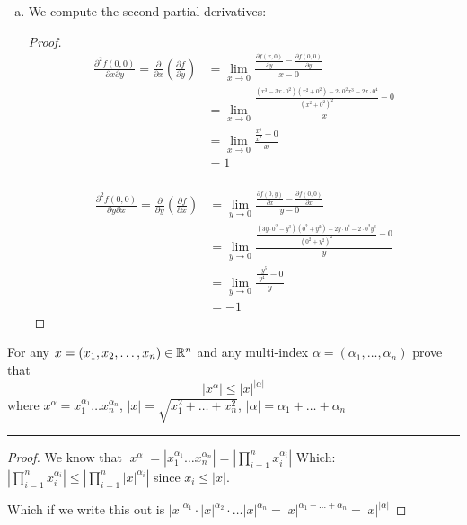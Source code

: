 \documentclass[11pt]{article}
\begin{document}
\begin{enumerate}[(a)]
    \item We compute the second partial derivatives:
    \begin{proof}
        
        \begin{align*}
            \frac{\partial ^2 f(0,0)}{\partial x \partial y} = \frac{\partial}{\partial x} \left( \frac{\partial f}{\partial y} \right) &= 
                \lim_{x \to 0} \frac{\frac{\partial f(x,0)}{\partial y} - \frac{\partial f(0,0)}{\partial y}}{x - 0}\\
            &= \lim_{x \to 0} \frac{\frac{(x^3 - 3x \cdot 0^2)(x^2 + 0^2) - 2 \cdot 0^2x^3-2x \cdot 0^4}{(x^2 + 0^2)^2} - 0}{x} \\
            &= \lim_{x \to 0} \frac{\frac{x^5}{x^4} - 0}{x} \\
            &= 1\\
        \end{align*}

        \begin{align*}
            \frac{\partial ^2 f(0,0)}{\partial y \partial x} = \frac{\partial}{\partial y} \left( \frac{\partial f}{\partial x} \right) &= 
                \lim_{y \to 0} \frac{\frac{\partial f(0,y)}{\partial x} - \frac{\partial f(0,0)}{\partial x}}{y - 0}\\
            &= \lim_{y \to 0} \frac{\frac{(3y \cdot 0^2 - y^3)(0^2 + y^2) - 2y \cdot 0^4-2 \cdot 0^2y^3}{(0^2 + y^2)^2} - 0}{y}\\
            &= \lim_{y \to 0} \frac{\frac{- y^5}{y^4} - 0}{y}\\
            &= -1
        \end{align*}

    \end{proof}
\end{enumerate}





For any $x = (x_1, x_2, \dots, x_n) \in \mathbb{R} ^n$ and any multi-index $\alpha = (\alpha_1, \dots, \alpha_n)$ prove that 
$$|x^\alpha| \leq |x|^{|\alpha|}$$
where $x^\alpha = x_1^{\alpha_1} \dots x_n^{\alpha_n}$, $|x| = \sqrt{x_1^2 + \dots + x_n^2}$, $|\alpha| = \alpha_1 + \dots + \alpha_n$

\hrule

\begin{proof}
    
    We know that $ |x^\alpha| = |x_1^{\alpha_1} \dots x_n^{\alpha_n}| = \left| \prod_{i = 1} ^n x_i^{\alpha_i} \right|$
    Which: $\left| \prod_{i = 1} ^n x_i^{\alpha_i} \right| \leq \left| \prod_{i = 1} ^n |x|^{\alpha_i} \right|$ since $x_i \leq |x|$.

    Which if we write this out is $|x|^{\alpha_1} \cdot |x|^{\alpha_2} \cdot \dots |x|^{\alpha_n} = |x|^{\alpha_1 + \dots + \alpha_n} = |x|^{|\alpha|}$

\end{proof}
\end{document}
